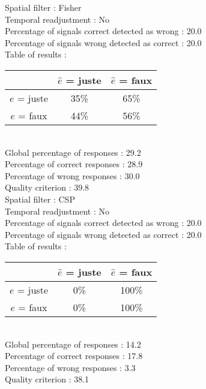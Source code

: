 Spatial filter : Fisher \\
Temporal readjustment : No \\
Percentage of signals correct detected as wrong :   20.0 \\
Percentage of signals wrong detected as correct :   20.0 \\
Table of results : \\
\begin{tabular}{|c|c|c|}
\hline				& $\hat{e}$ = juste & $\hat{e}$ = faux \\
\hline  $e$ = juste	&     35\%			&     65\%		\\
\hline  $e$ = faux	&     44\%			&     56\%		\\
\hline
\end{tabular}\\
Global percentage of responses :   29.2 \\
Percentage of correct responses :   28.9 \\
Percentage of wrong responses :   30.0 \\
Quality criterion :   39.8 \\

Spatial filter : CSP \\
Temporal readjustment : No \\
Percentage of signals correct detected as wrong :   20.0 \\
Percentage of signals wrong detected as correct :   20.0 \\
Table of results : \\
\begin{tabular}{|c|c|c|}
\hline				& $\hat{e}$ = juste & $\hat{e}$ = faux \\
\hline  $e$ = juste	&      0\%			&    100\%		\\
\hline  $e$ = faux	&      0\%			&    100\%		\\
\hline
\end{tabular}\\
Global percentage of responses :   14.2 \\
Percentage of correct responses :   17.8 \\
Percentage of wrong responses :    3.3 \\
Quality criterion :   38.1 \\

